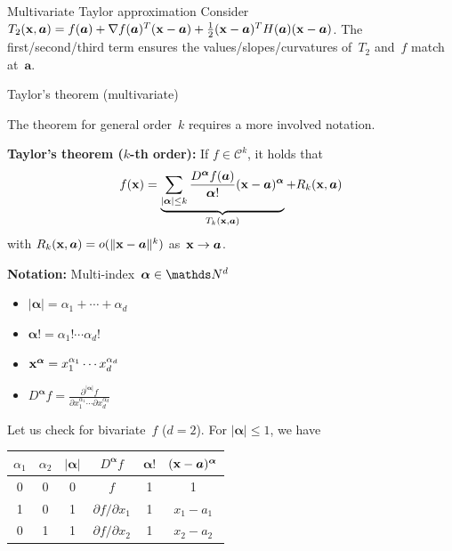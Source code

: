 \documentclass[11pt,compress,t,notes=noshow, xcolor=table]{beamer}
\begin{document}
\begin{vbframe}{Multivariate Taylor approximation}
Consider $T_2(\mathbf{x}, \bm{a}) = f(\bm{a}) + \nabla f(\bm{a})^T (\mathbf{x}-\bm{a}) + \frac{1}{2}(\mathbf{x}-\bm{a})^T H (\bm{a})(\mathbf{x}-\bm{a})$.
The first/second/third term ensures the values/slopes/curvatures of~$T_2$ and~$f$ match at~$\bm{a}$.

\end{vbframe}


\begin{vbframe}{Taylor's theorem (multivariate)}

The theorem for general order~$k$ requires a more involved notation.


    \textbf{Taylor's theorem ($k$-th order):} If $f \in \mathcal{C}^k$, it holds that
    \begin{equation*}
        f(\mathbf{x}) = \underbrace{\sum_{|\bm{\alpha}| \le k} \frac{D^{\bm{\alpha}} f(\bm{a})}{{\bm{\alpha}}!} (\mathbf{x} - \bm{a})^{\bm{\alpha}}}_{T_k(\mathbf{x}, \bm{a})} + R_k(\mathbf{x}, \bm{a})
    \end{equation*}
    with $R_k(\mathbf{x}, \bm{a}) = {o}(\|\mathbf{x}-\bm{a}\|^k)$ as~$\mathbf{x} \to \bm{a}$.


\textbf{Notation:} Multi-index~$\bm{\alpha} \in \N^d$

\begin{minipage}[t]{0.49\linewidth}
    \begin{itemize}
        \item $|\bm{\alpha}| = \alpha_1 + \cdots + \alpha_d$
        \item $\bm{\alpha}! = \alpha_1! \cdots \alpha_d!$
    \end{itemize}
\end{minipage}
\begin{minipage}[t]{0.49\linewidth}
    \begin{itemize}
        \item $\mathbf{x}^{\bm{\alpha}} = x_1^{\alpha_1} \cdots x_d^{\alpha_d}$
        \item $D^{\bm{\alpha}} f = \frac{\partial^{|\bm{\alpha}|} f}{\partial x_1^{\alpha_1} \cdots \partial x_d^{\alpha_d}}$
    \end{itemize}
\end{minipage}

\framebreak

Let us check for bivariate~$f$ ($d=2$).
For $|\bm{\alpha}| \le 1$, we have

\begin{table}
    \centering
    \begin{tabular}{c|c||c|c|c|c}
        $\alpha_1$ & $\alpha_2$ & $|\bm{\alpha}|$ & $D^{\bm{\alpha}} f$ & $\bm{\alpha}!$ & $(\mathbf{x}-\bm{a})^{\bm{\alpha}}$ \\ \hline\hline
        0 & 0 & 0 & $f$                         & 1 & 1          \\ \hline
        1 & 0 & 1 & $\partial f / \partial x_1$ & 1 & $x_1-a_1$  \\ \hline
        0 & 1 & 1 & $\partial f / \partial x_2$ & 1 & $x_2-a_2$
    \end{tabular}
\end{table}


\end{vbframe}
\end{document}
